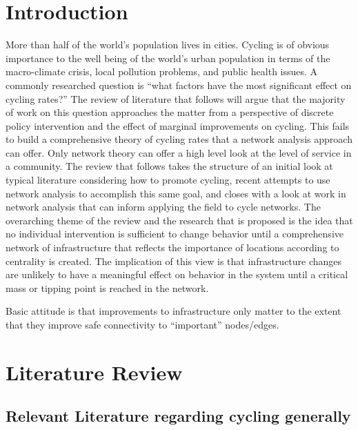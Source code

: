 \documentclass[11pt]{article} %
\begin{document}
\section{Introduction}

More than half of the world's population lives in cities. Cycling is of obvious importance to the well being of the world's  urban population in terms of the macro-climate crisis, local pollution problems, and public health issues. A commonly researched question is ``what factors have the most significant effect on cycling rates?'' The review of literature that follows will argue that the majority of work on this question approaches the matter from a perspective of discrete policy intervention and the effect of marginal improvements on cycling. This fails to build a comprehensive theory of cycling rates that a network analysis approach can offer. Only network theory can offer a high level look at the level of service in a community. The review that follows takes the structure of an initial look at typical literature considering how to promote cycling, recent attempts to use network analysis to accomplish this same goal, and closes with a look at work in network analysis that can inform applying the field to cycle networks. The overarching theme of the review and the research that is proposed is the idea that no individual intervention is sufficient to change behavior until a comprehensive network of infrastructure that reflects the importance of locations according to centrality is created. The implication of this view is that infrastructure changes are unlikely to have a meaningful effect on behavior in the system until a critical mass or tipping point is reached in the network. 

Basic attitude is that improvements to infrastructure only matter to the extent that they improve safe connectivity to ``important'' nodes/edges. 


\section{Literature Review}

\subsection{Relevant Literature regarding cycling generally}
\end{document}
